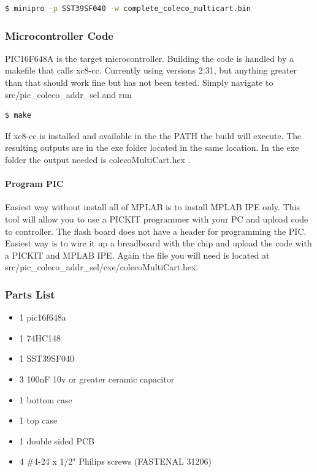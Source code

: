 \documentclass{article}
\begin{document}
  \begin{lstlisting}[language=bash]
   $ minipro -p SST39SF040 -w complete_coleco_multicart.bin
  \end{lstlisting}

  \subsubsection{Microcontroller Code}

  \par
  PIC16F648A is the target microcontroller. Building the code is handled by a makefile that calls xc8-cc. Currently using versions 2.31, but anything greater than that should work
  fine but has not been tested. Simply navigate to src/pic\_coleco\_addr\_sel and run

  \begin{lstlisting}[language=bash]
    $ make
  \end{lstlisting}

  If xc8-cc is installed and available in the the PATH the build will execute. The resulting
  outputs are in the exe folder located in the same location. In the exe folder the output needed is colecoMultiCart.hex .

  \paragraph{Program PIC}
  Easiest way without install all of MPLAB is to install MPLAB IPE only. This tool will allow you to use a PICKIT programmer with your PC and upload code to controller.
  The flash board does not have a header for programming the PIC. Easiest way is to wire it up a breadboard with the chip and upload the code with a PICKIT and MPLAB IPE.
  Again the file you will need is located at src/pic\_coleco\_addr\_sel/exe/colecoMultiCart.hex.

  \subsubsection{Parts List}

  \par
  \begin{itemize}
    \item 1 pic16f648a
    \item 1 74HC148
    \item 1 SST39SF040
    \item 3 100nF 10v or greater ceramic capacitor
    \item 1 bottom case
    \item 1 top case
    \item 1 double sided PCB
    \item 4 \#4-24 x 1/2" Philips screws (FASTENAL 31206)
  \end{itemize}
\end{document}
